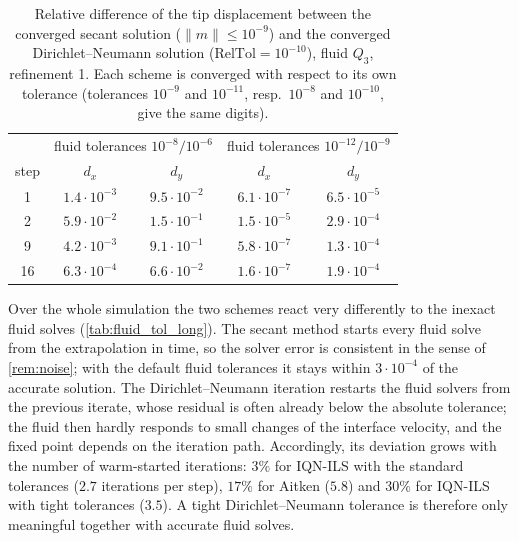 \documentclass[11pt,a4paper]{article}
\theoremstyle{definition}
\theoremstyle{remark}
\begin{document}
\begin{table}[ht]\centering
\caption{Relative difference of the tip displacement between the converged secant solution
($\|m\|\le10^{-9}$) and the converged Dirichlet--Neumann solution ($\mathrm{RelTol}=10^{-10}$),
fluid $Q_3$, refinement 1. Each scheme is converged with respect to its own tolerance (tolerances
$10^{-9}$ and $10^{-11}$, resp.\ $10^{-8}$ and $10^{-10}$, give the same digits).}
\label{tab:fluid_tol_startup}
\begin{tabular}{ccccc}
\toprule
& \multicolumn{2}{c}{fluid tolerances $10^{-8}/10^{-6}$} & \multicolumn{2}{c}{fluid tolerances $10^{-12}/10^{-9}$}\\
step & $d_x$ & $d_y$ & $d_x$ & $d_y$\\
\midrule
1 & $1.4\cdot10^{-3}$ & $9.5\cdot10^{-2}$ & $6.1\cdot10^{-7}$ & $6.5\cdot10^{-5}$\\
2 & $5.9\cdot10^{-2}$ & $1.5\cdot10^{-1}$ & $1.5\cdot10^{-5}$ & $2.9\cdot10^{-4}$\\
9 & $4.2\cdot10^{-3}$ & $9.1\cdot10^{-1}$ & $5.8\cdot10^{-7}$ & $1.3\cdot10^{-4}$\\
16 & $6.3\cdot10^{-4}$ & $6.6\cdot10^{-2}$ & $1.6\cdot10^{-7}$ & $1.9\cdot10^{-4}$\\
\bottomrule
\end{tabular}
\end{table}

Over the whole simulation the two schemes react very differently to the inexact fluid solves
(\cref{tab:fluid_tol_long}). The secant method starts every fluid solve from the extrapolation in
time, so the solver error is consistent in the sense of \cref{rem:noise}; with the default fluid
tolerances it stays within $3\cdot10^{-4}$ of the accurate solution. The Dirichlet--Neumann
iteration restarts the fluid solvers from the previous iterate, whose residual is often already
below the absolute tolerance; the fluid then hardly responds to small changes of the interface
velocity, and the fixed point depends on the iteration path. Accordingly, its deviation grows with
the number of warm-started iterations: $3\%$ for IQN-ILS with the standard tolerances ($2.7$
iterations per step), $17\%$ for Aitken ($5.8$) and $30\%$ for IQN-ILS with tight tolerances
($3.5$). A tight Dirichlet--Neumann tolerance is therefore
only meaningful together with accurate fluid solves.
\end{document}
